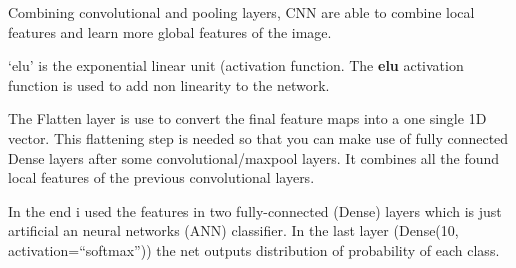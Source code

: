 \documentclass[11pt]{article}
\begin{document}
Combining convolutional and pooling layers, CNN are able to combine
local features and learn more global features of the image.

`elu' is the exponential linear unit (activation function. The
\textbf{elu} activation function is used to add non linearity to the
network.

The Flatten layer is use to convert the final feature maps into a one
single 1D vector. This flattening step is needed so that you can make
use of fully connected Dense layers after some convolutional/maxpool
layers. It combines all the found local features of the previous
convolutional layers.

In the end i used the features in two fully-connected (Dense) layers
which is just artificial an neural networks (ANN) classifier. In the
last layer (Dense(10, activation=``softmax'')) the net outputs
distribution of probability of each class.
\end{document}
